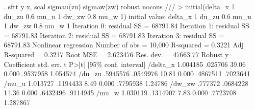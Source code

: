 . sftt y x, scal sigmau(zu) sigmaw(zw) robust nocons ///
>          initial(delta_x 1 du_zu 0.6 mu_u 1 dw_zw 0.8 mu_w 1)
initial value: delta_x 1 du_zu 0.6 mu_u 1 dw_zw 0.8 mu_w 1
{\smallskip}
Iteration 0:  residual SS =  68791.84
Iteration 1:  residual SS =  68791.83
Iteration 2:  residual SS =  68791.83
Iteration 3:  residual SS =  68791.83
{\smallskip}
{\smallskip}
Nonlinear regression                                Number of obs =     10,000
                                                    R-squared     =     0.3221
                                                    Adj R-squared =     0.3217
                                                    Root MSE      =   2.623476
                                                    Res. dev.     =   47663.77
{\smallskip}
{}
             {\VBAR}               Robust
           y {\VBAR} Coefficient  std. err.      t    P>|t|     [95\% conf. interval]
    /delta_x {\VBAR}   1.004185    .025706    39.06   0.000     .9537958    1.054574
      /du_zu {\VBAR}   .5945576   .0549976    10.81   0.000     .4867511    .7023641
       /mu_u {\VBAR}   1.013727   .1194433     8.49   0.000     .7795938     1.24786
      /dw_zw {\VBAR}    .777372   .0684228    11.36   0.000     .6432496    .9114945
       /mu_w {\VBAR}   1.030119   .1314907     7.83   0.000     .7723708    1.287867
